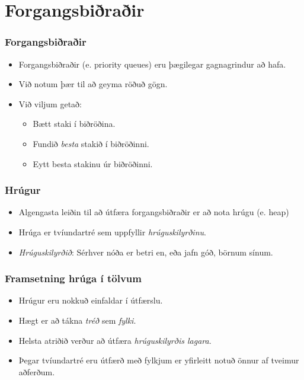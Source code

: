 \documentclass{beamer}
\begin{document}
\section[Forgangsbiðraðir]{Forgangsbiðraðir}

\begin{frame}
\frametitle{Forgangsbiðraðir}
\begin{itemize}

\item<1-> Forgangsbiðraðir (e. priority queues) eru þægilegar gagnagrindur að hafa.
\item<2-> Við notum þær til að geyma röðuð gögn.
\item<3-> Við viljum getað:
	\begin{itemize}
		\item<4-> Bætt staki í biðröðina.
		\item<5-> Fundið \emph{besta} stakið í biðröðinni.
		\item<6-> Eytt besta stakinu úr biðröðinni.
	\end{itemize}

\end{itemize}
\end{frame}

\begin{frame}
\frametitle{Hrúgur}
\begin{itemize}

\item<1-> Algengasta leiðin til að útfæra forgangsbiðraðir er að nota hrúgu (e. heap)
\item<2-> Hrúga er tvíundartré sem uppfyllir \emph{hrúguskilyrðinu}.
\item<3-> \emph{Hrúguskilyrðið}: Sérhver nóða er betri en, eða jafn góð, börnum sínum.

\end{itemize}
\end{frame}

\begin{frame}
\frametitle{Framsetning hrúga í tölvum}
\begin{itemize}

\item<1-> Hrúgur eru nokkuð einfaldar í útfærslu.
\item<2-> Hægt er að tákna \emph{tréð} sem \emph{fylki}.
\item<3-> Helsta atriðið verður að útfæra \emph{hrúguskilyrðis lagara}.
\item<4-> Þegar tvíundartré eru útfærð með fylkjum er yfirleitt notuð önnur af tveimur aðferðum.

\end{itemize}
\end{frame}
\end{document}
